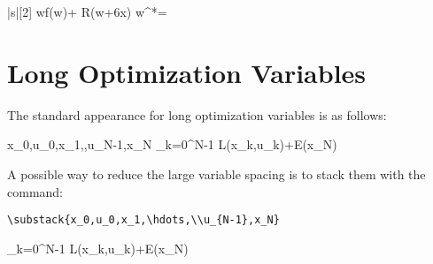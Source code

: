 \documentclass[a4paper]{article}
\begin{document}
\begin{mini!}|s|[2]
	{w}{f(w)+ R(w+6x)\label{eq:ObjectiveExample3}}
	{\label{eq:Example3}}
	{w^*=}
\end{mini!}


\section{Long Optimization Variables}
The standard appearance for long optimization variables is as follows:

\begin{mini!}
	{x_0,u_0,x_1,\hdots,u_{N-1},x_N}
	{\sum_{k=0}^{N-1} L(x_k,u_k)\!\!+\!\!E(x_N)\label{OCPobj}}
	{\label{eq:OCP}}{}
\end{mini!}

\noindent A possible way to reduce the large variable spacing is to stack them with the command: \begin{verbatim}
\substack{x_0,u_0,x_1,\hdots,\\u_{N-1},x_N}
\end{verbatim}

\begin{mini!}
	{}
	{\sum_{k=0}^{N-1} L(x_k,u_k)\!\!+\!\!E(x_N)\label{OCPobj}}
	{\label{eq:OCP}}{}
\end{mini!}
\end{document}
